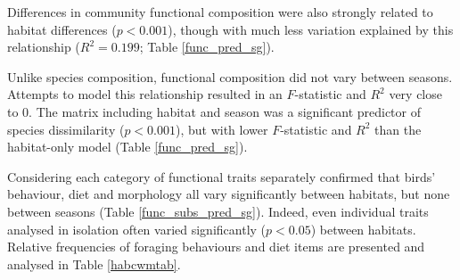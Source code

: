 \documentclass[12pt,a4paper]{article}\usepackage[]{graphicx}\usepackage[]{color}
\begin{document}
Differences in community functional composition were also strongly related to habitat differences ($p < 0.001$), though with much less variation explained by this relationship ($R^2 = 0.199$; Table \ref{func_pred_sg}). 

Unlike species composition, functional composition did not vary between seasons. Attempts to model this relationship resulted in an $F$-statistic and $R^2$ very close to $0$. The matrix including habitat and season was a significant predictor of species dissimilarity ($p < 0.001$), but with lower $F$-statistic and $R^2$ than the habitat-only model (Table \ref{func_pred_sg}).

Considering each category of functional traits separately confirmed that birds' behaviour, diet and morphology all vary significantly between habitats, but none between seasons (Table \ref{func_subs_pred_sg}). Indeed, even individual traits analysed in isolation often varied significantly ($p < 0.05$) between habitats. Relative frequencies of foraging behaviours and diet items are presented and analysed in Table \ref{habcwmtab}.
\end{document}
